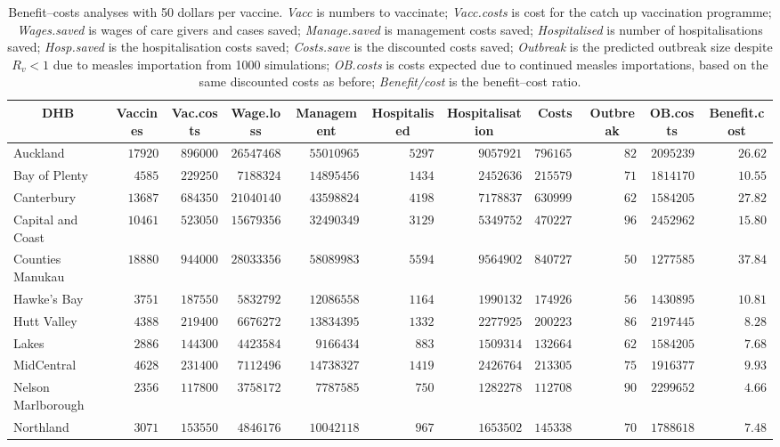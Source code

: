 \documentclass{article}
\begin{document}
\begin{itemize}
\begin{table}\small
\caption{Benefit--costs analyses with 50 dollars per vaccine. \textit{Vacc} is numbers to vaccinate; \textit{Vacc.costs} is cost for the catch up vaccination programme; \textit{Wages.saved} is wages of care givers and cases saved; \textit{Manage.saved} is management costs saved; \textit{Hospitalised} is number of hospitalisations saved; \textit{Hosp.saved} is the hospitalisation costs saved; \textit{Costs.save}  is the discounted costs saved; \textit{Outbreak}	is the predicted outbreak size despite $R_v < 1$ due to measles importation from 1000 simulations; \textit{OB.costs}	is costs expected due to continued measles importations, based on the same discounted costs as before; \textit{Benefit/cost} is the benefit--cost ratio.}
\begin{center}
\begin{tabular}{lrrrrrrrrrr}
\hline\hline
\multicolumn{1}{c}{DHB}&\multicolumn{1}{c}{Vaccines}&\multicolumn{1}{c}{Vac.costs}&\multicolumn{1}{c}{Wage.loss}&\multicolumn{1}{c}{Management}&\multicolumn{1}{c}{Hospitalised}&\multicolumn{1}{c}{Hospitalisation}&\multicolumn{1}{c}{Costs}&\multicolumn{1}{c}{Outbreak}&\multicolumn{1}{c}{OB.costs}&\multicolumn{1}{c}{Benefit.cost}\tabularnewline
\hline
Auckland&$17920$&$896000$&$26547468$&$55010965$&$5297$&$9057921$&$79616516$&$ 82$&$2095239$&$26.62$\tabularnewline
Bay of Plenty&$ 4585$&$229250$&$ 7188324$&$14895456$&$1434$&$2452636$&$21557962$&$ 71$&$1814170$&$10.55$\tabularnewline
Canterbury&$13687$&$684350$&$21040140$&$43598824$&$4198$&$7178837$&$63099902$&$ 62$&$1584205$&$27.82$\tabularnewline
Capital and Coast&$10461$&$523050$&$15679356$&$32490349$&$3129$&$5349752$&$47022778$&$ 96$&$2452962$&$15.80$\tabularnewline
Counties Manukau&$18880$&$944000$&$28033356$&$58089983$&$5594$&$9564902$&$84072731$&$ 50$&$1277585$&$37.84$\tabularnewline
Hawke's Bay&$ 3751$&$187550$&$ 5832792$&$12086558$&$1164$&$1990132$&$17492688$&$ 56$&$1430895$&$10.81$\tabularnewline
Hutt Valley&$ 4388$&$219400$&$ 6676272$&$13834395$&$1332$&$2277925$&$20022305$&$ 86$&$2197445$&$ 8.28$\tabularnewline
Lakes&$ 2886$&$144300$&$ 4423584$&$ 9166434$&$ 883$&$1509314$&$13266438$&$ 62$&$1584205$&$ 7.68$\tabularnewline
MidCentral&$ 4628$&$231400$&$ 7112496$&$14738327$&$1419$&$2426764$&$21330552$&$ 75$&$1916377$&$ 9.93$\tabularnewline
Nelson Marlborough&$ 2356$&$117800$&$ 3758172$&$ 7787585$&$ 750$&$1282278$&$11270851$&$ 90$&$2299652$&$ 4.66$\tabularnewline
Northland&$ 3071$&$153550$&$ 4846176$&$10042118$&$ 967$&$1653502$&$14533802$&$ 70$&$1788618$&$ 7.48$\tabularnewline

\end{tabular}
\end{center}
\end{table}
\end{itemize}
\end{document}
